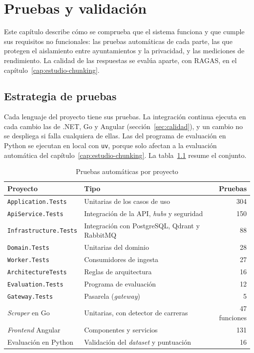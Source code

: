 \chapter{Pruebas y validación}
\label{cap:pruebas}

Este capítulo describe cómo se comprueba que el sistema funciona y que cumple sus requisitos no funcionales: las pruebas automáticas de cada parte, las que protegen el aislamiento entre ayuntamientos y la privacidad, y las mediciones de rendimiento. La calidad de las respuestas se evalúa aparte, con RAGAS, en el capítulo~\ref{cap:estudio-chunking}.

\section{Estrategia de pruebas}
\label{sec:estrategia-pruebas}

Cada lenguaje del proyecto tiene sus pruebas. La integración continua ejecuta en cada cambio las de .NET, Go y Angular (sección~\ref{sec:calidad}), y un cambio no se despliega si falla cualquiera de ellas. Las del programa de evaluación en Python se ejecutan en local con \texttt{uv}, porque solo afectan a la evaluación automática del capítulo~\ref{cap:estudio-chunking}. La tabla~\ref{tab:pruebas} resume el conjunto.

\begin{table}[htbp]
\centering\small
\caption{Pruebas automáticas por proyecto}
\label{tab:pruebas}
\begin{tabular}{@{}l l r@{}}
\toprule
\textbf{Proyecto} & \textbf{Tipo} & \textbf{Pruebas} \\
\midrule
\texttt{Application.Tests} & Unitarias de los casos de uso & 304 \\
\texttt{ApiService.Tests} & Integración de la API, \emph{hubs} y seguridad & 150 \\
\texttt{Infrastructure.Tests} & Integración con PostgreSQL, Qdrant y RabbitMQ & 88 \\
\texttt{Domain.Tests} & Unitarias del dominio & 28 \\
\texttt{Worker.Tests} & Consumidores de ingesta & 27 \\
\texttt{ArchitectureTests} & Reglas de arquitectura & 16 \\
\texttt{Evaluation.Tests} & Programa de evaluación & 12 \\
\texttt{Gateway.Tests} & Pasarela (\emph{gateway}) & 5 \\
\midrule
\emph{Scraper} en Go & Unitarias, con detector de carreras & 47 funciones \\
\emph{Frontend} Angular & Componentes y servicios & 131 \\
Evaluación en Python & Validación del \emph{dataset} y puntuación & 16 \\
\bottomrule
\end{tabular}
\end{table}

